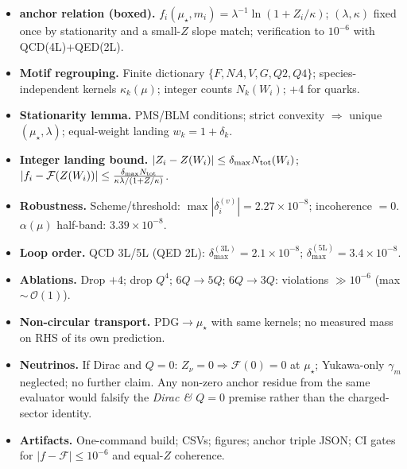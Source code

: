 \documentclass[epjc3]{svjour3}
\begin{document}
\begin{itemize}
  \item \textbf{anchor relation (boxed).} $f_i(\mu_\star,m_i)=\lambda^{-1}\ln(1+Z_i/\kappa)$; $(\lambda,\kappa)$ fixed once by stationarity and a small-$Z$ slope match; verification to $10^{-6}$ with QCD(4L)+QED(2L).

\iffalse
  \item \textbf{Equal-$Z$ degeneracy.} Three horizontal bands at $\mu_\star$; anchor ratios $m_i/m_j|_{\mu_\star}=\varphi^{\Delta r}$ (to $10^{-6}$).
\fi

  \item \textbf{Motif regrouping.} Finite dictionary $\{F,NA,V,G,Q2,Q4\}$; species-independent kernels $\kappa_k(\mu)$; integer counts $N_k(W_i)$; +4 for quarks.
  \item \textbf{Stationarity lemma.} PMS/BLM conditions; strict convexity $\Rightarrow$ unique $(\mu_\star,\lambda)$; equal-weight landing $w_k=1+\delta_k$.
  \item \textbf{Integer landing bound.} $|Z_i-Z(W_i)|\le \delta_{\max}N_{\rm tot}(W_i)$; $|f_i-\mathcal F(Z(W_i))|\le \frac{\delta_{\max}N_{\rm tot}}{\kappa\lambda/(1+Z/\kappa)}$.
  \item \textbf{Robustness.} Scheme/threshold: $\max|\delta_i^{(v)}|=2.27\times10^{-8}$; incoherence $=0$. $\alpha(\mu)$ half-band: $3.39\times10^{-8}$.
  \item \textbf{Loop order.} QCD 3L/5L (QED 2L): $\delta_{\max}^{(3\mathrm L)}=2.1\times10^{-8}$; $\delta_{\max}^{(5\mathrm L)}=3.4\times10^{-8}$.
  \item \textbf{Ablations.} Drop $+4$; drop $Q^4$; $6Q\to5Q$; $6Q\to3Q$: violations $\gg10^{-6}$ (max $\sim\,\mathcal O(1)$).
  \item \textbf{Non-circular transport.} PDG$\to\mu_\star$ with same kernels; no measured mass on RHS of its own prediction.
  \item \textbf{Neutrinos.} If Dirac and $Q=0$: $Z_\nu=0\Rightarrow \mathcal F(0)=0$ at $\mu_\star$; Yukawa-only $\gamma_m$ neglected; no further claim. Any non-zero anchor residue from the same evaluator would falsify the \emph{Dirac \/\& $Q=0$} premise rather than the charged-sector identity.
  \item \textbf{Artifacts.} One-command build; CSVs; figures; anchor triple JSON; CI gates for $|f-\mathcal F|\le10^{-6}$ and equal-$Z$ coherence.
\end{itemize}
\end{document}
